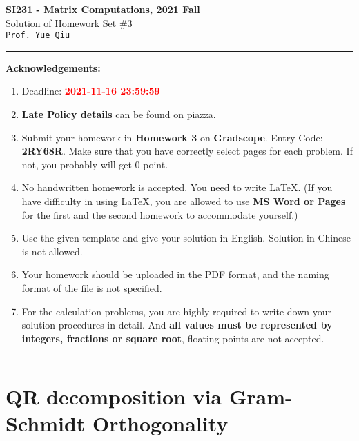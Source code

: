 \documentclass[english,onecolumn]{IEEEtran}
\begin{document}
\begin{center}
	\textbf{\LARGE{SI231 - Matrix Computations, 2021 Fall}}\\
	{\Large Solution of Homework Set \#3}\\
	\texttt{Prof. Yue Qiu}
\par\end{center}

\noindent
\rule{\linewidth}{0.4pt}
{\bf Acknowledgements:}
\begin{enumerate}
	\item Deadline: {\bf \textcolor{red}{2021-11-16 23:59:59}}
	\item \textbf{Late Policy details} can be found on piazza.
	\item Submit your homework in \textbf{Homework 3} on \textbf{Gradscope}. Entry Code: \textbf{2RY68R}. Make sure that you have correctly select pages for each problem. If not, you probably will get 0 point.
	\item No handwritten homework is accepted. You need to write \LaTeX. (If you have difficulty in using \LaTeX, you are allowed to use \textbf{MS Word or Pages} for the first and the second homework to accommodate yourself.)
	\item Use the given template and give your solution in English. Solution in Chinese is not allowed.
	\item Your homework should be uploaded in the PDF format, and the naming format of the file is not specified.
	\item For the calculation problems, you are highly required to write down your solution procedures in detail. And \textbf{all values must be represented by integers, fractions or square root}, floating points are not accepted.
\end{enumerate}
\rule{\linewidth}{0.4pt}

\section{QR decomposition via Gram-Schmidt Orthogonality}
\end{document}
